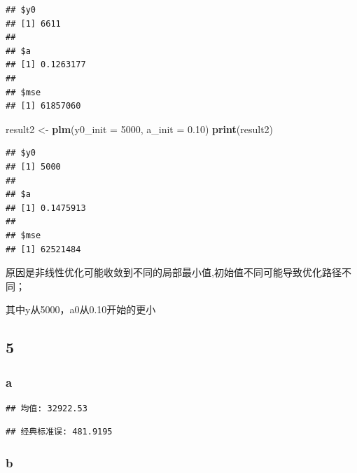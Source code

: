 \documentclass[
]{article}
\newenvironment{Shaded}{\begin{snugshade}}{\end{snugshade}}
\newcommand{\AttributeTok}[1]{\textcolor[rgb]{0.13,0.29,0.53}{#1}}
\newcommand{\CommentTok}[1]{\textcolor[rgb]{0.56,0.35,0.01}{\textit{#1}}}
\newcommand{\ControlFlowTok}[1]{\textcolor[rgb]{0.13,0.29,0.53}{\textbf{#1}}}
\newcommand{\DecValTok}[1]{\textcolor[rgb]{0.00,0.00,0.81}{#1}}
\newcommand{\FloatTok}[1]{\textcolor[rgb]{0.00,0.00,0.81}{#1}}
\newcommand{\FunctionTok}[1]{\textcolor[rgb]{0.13,0.29,0.53}{\textbf{#1}}}
\newcommand{\NormalTok}[1]{#1}
\newcommand{\OtherTok}[1]{\textcolor[rgb]{0.56,0.35,0.01}{#1}}
\newcommand{\SpecialCharTok}[1]{\textcolor[rgb]{0.81,0.36,0.00}{\textbf{#1}}}
\begin{document}
\begin{verbatim}
## $y0
## [1] 6611
## 
## $a
## [1] 0.1263177
## 
## $mse
## [1] 61857060
\end{verbatim}

\begin{Shaded}
\begin{Highlighting}[]
\NormalTok{result2 }\OtherTok{\textless{}{-}} \FunctionTok{plm}\NormalTok{(}\AttributeTok{y0\_init =} \DecValTok{5000}\NormalTok{, }\AttributeTok{a\_init =} \FloatTok{0.10}\NormalTok{)}
\FunctionTok{print}\NormalTok{(result2)}
\end{Highlighting}
\end{Shaded}

\begin{verbatim}
## $y0
## [1] 5000
## 
## $a
## [1] 0.1475913
## 
## $mse
## [1] 62521484
\end{verbatim}

原因是非线性优化可能收敛到不同的局部最小值,初始值不同可能导致优化路径不同；

其中y从5000，a0从0.10开始的更小

\subsection{5}\label{section-4}

\subsubsection{a}\label{a}

\begin{verbatim}
## 均值: 32922.53
\end{verbatim}

\begin{verbatim}
## 经典标准误: 481.9195
\end{verbatim}

\subsubsection{b}\label{b}

\begin{Shaded}
\end{Shaded}
\end{document}

